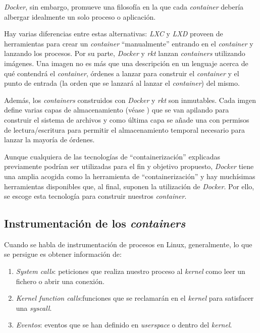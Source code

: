 \emph{Docker}, sin embargo, promueve una filosofía en la que cada \emph{container} debería albergar idealmente un solo proceso o aplicación.

Hay varias diferencias entre estas alternativas: \emph{LXC} y \emph{LXD} proveen de herramientas para crear un \emph{container} ``manualmente'' entrando en el \emph{container} y lanzando los procesos. Por su parte, \emph{Docker} y \emph{rkt}
lanzan \emph{containers} utilizando imágenes. Una imagen no es más que una descripción en un lenguaje acerca de qué contendrá el \emph{container}, órdenes a lanzar para construir el \emph{container} y el punto de entrada (la orden que se lanzará al lanzar el \emph{container}) del mismo.

Además, los \emph{containers} construidos con \emph{Docker} y \emph{rkt} son inmutables. Cada imgen define varias capas de almacenamiento (véase \cite{docker-storage}) que se van apilando
para construir el sistema de archivos y como última capa se añade una con permisos de lectura/escritura para permitir el almacenamiento temporal necesario para lanzar
la mayoría de órdenes.

Aunque cualquiera de las tecnologías de ``containerización'' explicadas previamente podrían ser utilizadas para el fin y objetivo propuesto, \emph{Docker} tiene una amplia acogida como la herramienta de ``containerización''
y hay muchísimas herramientas disponibles que, al final, suponen la utilización de \emph{Docker}. Por ello, se escoge esta tecnología para construir nuestros \emph{container}.

\subsection{Instrumentación de los \emph{containers}}
\label{subsec:instrumentacion-containers}

Cuando se habla de instrumentación de procesos en Linux, generalmente, lo que se persigue es obtener información de:
\begin{enumerate}
    \item \emph{System calls}: peticiones que realiza nuestro proceso al \emph{kernel} como leer un fichero o abrir una conexión.
    \item \emph{Kernel function calls}:funciones que se reclamarán en el \emph{kernel} para satisfacer una \emph{syscall}.
    \item \emph{Eventos}: eventos que se han definido en \emph{userspace} o dentro del \emph{kernel}.
\end{enumerate}

